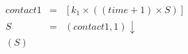 
\begin{eqnarray*}
\mathit{contact1} & = & [k_1\times ((\mathit{time}+1)\times S)]\\
%

%

%

%
S & = & (\mathit{contact1},1){\downarrow}\\
%

%
(S)\end{eqnarray*}
